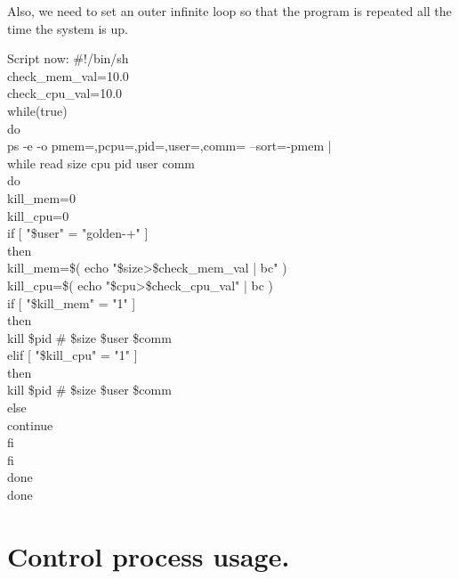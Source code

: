\documentclass[12pt,a4paper]{article}
\begin{document}
Also, we need to set an outer infinite loop so that the program is repeated all the time the system is up.\\
\begin{flushleft}
Script now:
\newline
\#!/bin/sh\\
check\_mem\_val=10.0\\
check\_cpu\_val=10.0\\
while(true)\\
do\\
ps -e -o pmem=,pcpu=,pid=,user=,comm= --sort=-pmem |\\
  while read size cpu pid user comm\\
  do\\
kill\_mem=0\\
kill\_cpu=0\\
if [ "\$user" = "golden-+" ]\\
    then\\
kill\_mem=\$( echo "\$size>\$check\_mem\_val | bc" )\\
kill\_cpu=\$( echo "\$cpu>\$check\_cpu\_val" | bc )\\
 if [ "\$kill\_mem" = "1" ]\\
      then\\
        kill \$pid \# \$size \$user \$comm\\
      elif [ "\$kill\_cpu" = "1" ]\\
      then\\
        kill \$pid \# \$size \$user \$comm\\
      else\\
        continue\\
      fi\\
fi\\
  done\\
done\\
\end{flushleft}
\newpage
\section{Control process usage.}
\end{document}
